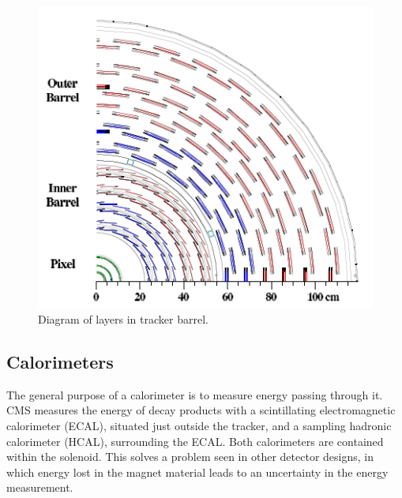 \begin{figure}[htb]
  \begin{center}
    \includegraphics[width=360pt]{Figures/tracker-schematic.png}
  \end{center}
  \caption[\fixspacing Diagram of layers in tracker barrel]
	  {\fixspacing Diagram of layers in tracker barrel.}
  \label{fig:TrackerBarrel}
 \end{figure}

\subsection{Calorimeters}
\label{exp:cal}
The general purpose of a calorimeter 
is to measure energy passing through it.  
CMS measures the energy of decay products 
with a scintillating electromagnetic calorimeter (ECAL),
situated just outside the tracker,
and a sampling hadronic calorimeter (HCAL),
surrounding the ECAL.  
Both calorimeters are contained within the solenoid.  
This solves a problem seen in other detector designs, 
in which energy lost in the magnet material leads 
to an uncertainty in the energy measurement.  

